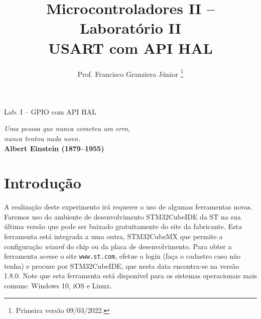 \documentclass[12pt,journal,compsoc]{IEEEtran}
\begin{document}
\title{Microcontroladores II -- Laboratório II \\ USART com API HAL}

\author{Prof. Francisco Granziera Júnior
\thanks{Primeira versão 09/03/2022.}}

%
{\MakeLowercase{}Lab. I -- GPIO com API HAL}


\maketitle

\IEEEdisplaynontitleabstractindextext

\IEEEpeerreviewmaketitle

\begin{flushright}
    {\textit{Uma pessoa que nunca cometeu um erro,\\
    nunca tentou nada novo.}\\
      \textbf{Albert Einstein (1879--1955)}}
\end{flushright} 

\section{Introdução}

{A} realização deste experimento irá requerer o uso de algumas ferramentas novas. Faremos uso do ambiente de desenvolvimento STM32CubeIDE da ST na sua última versão que pode ser baixado gratuitamente do site da fabricante. Esta ferramenta está integrada a uma outra, STM32CubeMX que permite a configuração \emph{wizard} do chip ou da placa de desenvolvimento. Para obter a ferramenta acesse o site \texttt{www.st.com}, efetue o login (faça o cadastro caso não tenha) e procure por STM32CubeIDE, que nesta data encontra-se na versão 1.8.0. Note que esta ferramenta está disponível para os sistemas operacionais mais comuns: Windows 10, iOS e Linux.
\end{document}
